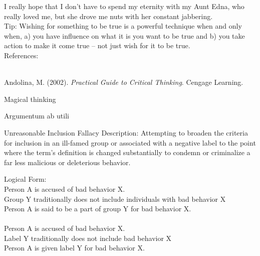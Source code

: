\documentclass[a4paper,12pt,single,pdftex]{scrartcl}
\begin{document}
{    
      I really hope that I don’t have to spend my eternity with my Aunt Edna, who really loved me, but she drove me nuts with her constant jabbering.
    \\

    
      Tip: Wishing for something to be true is a powerful technique when and only when, a) you have influence on what it is you want to be true and b) you take action to make it come true -- not just wish for it to be true.
    \\

    References:

    
      
        
      \\

      
        
          Andolina, M. (2002). {\it Practical Guide to Critical Thinking}. Cengage Learning.
        
      
    
  }


Magical thinking

Argumentum ab utili

Unreasonable Inclusion Fallacy
    Description: Attempting to broaden the criteria for inclusion in an ill-famed group or associated with a negative label to the point where the term's definition is changed substantially to condemn or criminalize a far less malicious or deleterious behavior.

    
      Logical Form:
    \\

    
      Person A is accused of bad behavior X.
    \\

    
      Group Y traditionally does not include individuals with bad behavior X
    \\

    
      Person A is said to be a part of group Y for bad behavior X.
    \\

    
      
    \\

    
      Person A is accused of bad behavior X.
    \\

    
      Label Y traditionally does not include bad behavior X
    \\

    
      Person A is given label Y for bad behavior X.
    \\
\end{document}
